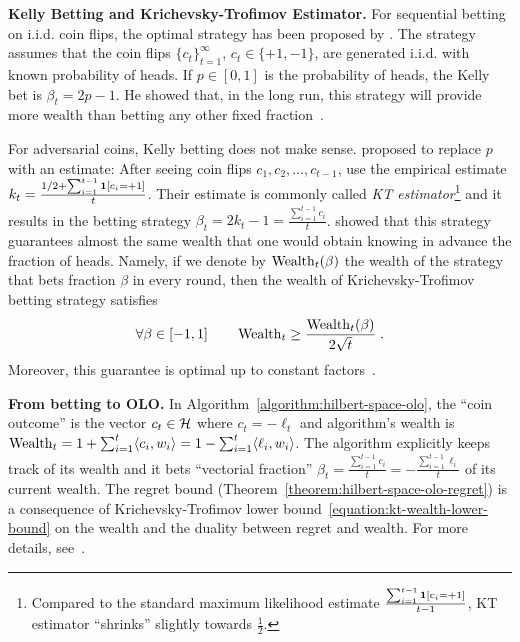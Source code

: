 \textbf{Kelly Betting and Krichevsky-Trofimov Estimator.}
For sequential betting on i.i.d. coin flips, the optimal strategy has been
proposed by \citet{Kelly-1956}.  The strategy assumes that the coin flips
$\{c_t\}_{t=1}^\infty$, $c_t \in \{+1,-1\}$, are generated i.i.d. with known
probability of heads. If $p \in [0,1]$ is the probability of heads, the Kelly
bet is $\beta_t = 2p - 1$. He showed that, in the long run, this strategy will
provide more wealth than betting any other fixed fraction~\cite{Kelly-1956}.

For adversarial coins, Kelly betting does not make sense.
\citet{Krichevsky-Trofimov-1981} proposed to replace $p$ with an estimate:
After seeing coin flips $c_1, c_2, \dots, c_{t-1}$, use the empirical
estimate $k_t = \frac{1/2 + \sum_{i=1}^{t-1} \mathbf{1}[c_i = +1]}{t}$. Their
estimate is commonly called \emph{KT estimator}\footnote{Compared to the
standard maximum likelihood estimate $\frac{\sum_{i=1}^{t-1} \mathbf{1}[c_i =
+1]}{t-1}$, KT estimator ``shrinks'' slightly towards $\frac{1}{2}$.} and it
results in the betting strategy $\beta_t = 2k_t - 1 = \tfrac{\sum_{i=1}^{t-1}
c_i}{t}$.  \citeauthor{Krichevsky-Trofimov-1981} showed that this strategy
guarantees almost the same wealth that one would obtain knowing in advance the
fraction of heads. Namely, 
if we denote by $\operatorname{Wealth}_t(\beta)$ the wealth of the strategy that bets fraction
$\beta$ in every round, then the wealth of Krichevsky-Trofimov betting strategy
satisfies
\begin{equation}
\label{equation:kt-wealth-lower-bound}
\forall \beta \in [-1,1] \qquad \operatorname{Wealth}_t \ge \frac{\operatorname{Wealth}_t(\beta)}{2\sqrt{t}} \; .
\end{equation}
Moreover, this guarantee is optimal up to constant factors~\citep{Cesa-Bianchi-Lugosi-2006}.

\textbf{From betting to \ac{OLO}.}
In Algorithm~\ref{algorithm:hilbert-space-olo}, the ``coin outcome'' is the
vector $c_t \in \mathcal{H}$ where $c_t = -\ell_t$ and algorithm's wealth is $\operatorname{Wealth}_t
= 1 + \sum_{i=1}^t \langle c_i, w_i \rangle = 1 - \sum_{i=1}^t \langle \ell_i,
w_i \rangle$.  The algorithm explicitly keeps track of its wealth and it bets
``vectorial fraction'' $\beta_t = \tfrac{\sum_{i=1}^{t-1} c_i}{t} = -
\tfrac{\sum_{i=1}^{t-1}\ell_i}{t}$ of its current wealth. The regret bound
(Theorem~\ref{theorem:hilbert-space-olo-regret}) is a consequence of
Krichevsky-Trofimov lower bound~\eqref{equation:kt-wealth-lower-bound} on the
wealth and the duality between regret and wealth.  For more details,
see~\cite{Orabona-Pal-2016-parameter-free}.
